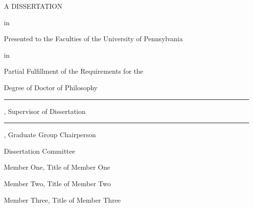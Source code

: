 \begin{titlepage}
\thispagestyle{empty} %
\begin{center}


\mytitle

\myauthor

A DISSERTATION

in 

\mydepartment 

Presented to the Faculties of the University of Pennsylvania

in 

Partial Fulfillment of the Requirements for the

Degree of Doctor of Philosophy

\myyear

\vfill
\end{center}

\vfill %


\begin{flushleft}

\blankline

\blankline

\singlespacing

\rule{\linewidth}{0.3mm}
\mysupervisorname, Supervisor of Dissertation \\
\mysupervisortitle

\doublespacing

\blankline

\blankline

\singlespacing

\rule{\linewidth}{0.3mm}
\gradchairname, Graduate Group Chairperson \\
\gradchairtitle

\doublespacing

\halfblankline

\singlespacing

Dissertation Committee %

\blankline

Member One, Title of Member One

Member Two, Title of Member Two

Member Three, Title of Member Three

\end{flushleft}

\end{titlepage}

